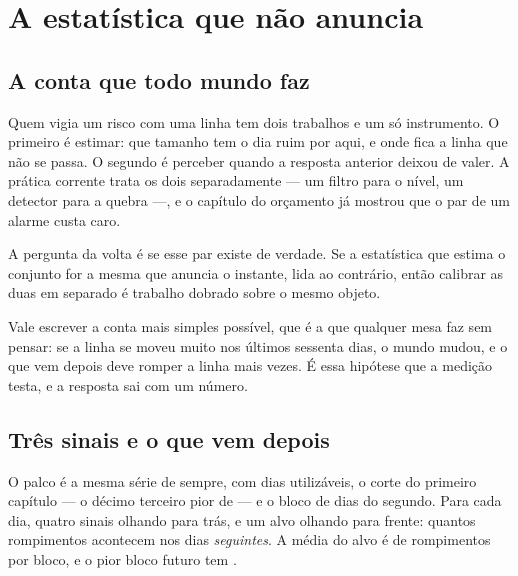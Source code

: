 %
%

\chapter{A estatística que não anuncia}
\label{cap:estabilidade}

\section{A conta que todo mundo faz}

Quem vigia um risco com uma linha tem dois trabalhos e um só instrumento. O primeiro é estimar:
que tamanho tem o dia ruim por aqui, e onde fica a linha que não se passa. O segundo é perceber
quando a resposta anterior deixou de valer. A prática corrente trata os dois separadamente
--- um filtro para o nível, um detector para a quebra ---, e o capítulo do orçamento já mostrou que o par de
um alarme custa caro.

A pergunta da volta é se esse par existe de verdade. Se a estatística que estima o conjunto for
a mesma que anuncia o instante, lida ao contrário, então calibrar as duas em separado é trabalho
dobrado sobre o mesmo objeto.

Vale escrever a conta mais simples possível, que é a que qualquer mesa faz sem pensar: se a
linha se moveu muito nos últimos sessenta dias, o mundo mudou, e o que vem depois deve romper a
linha mais vezes. É essa hipótese que a medição testa, e a resposta sai com um número.

\section{Três sinais e o que vem depois}

O palco é a mesma série de sempre, com \numEstabilidadeDias{} dias utilizáveis, o corte do
primeiro capítulo --- o décimo terceiro pior de \numCorteJanela{} --- e o bloco de
\numBlocoDias{} dias do segundo. Para cada dia, quatro sinais olhando para trás, e um alvo olhando
para frente: quantos rompimentos acontecem nos \numBlocoDias{} dias \emph{seguintes}. A média do
alvo é de \numEstabilidadeFuturoMedio{} rompimentos por bloco, e o pior bloco futuro tem
\numEstabilidadeFuturoPior.

